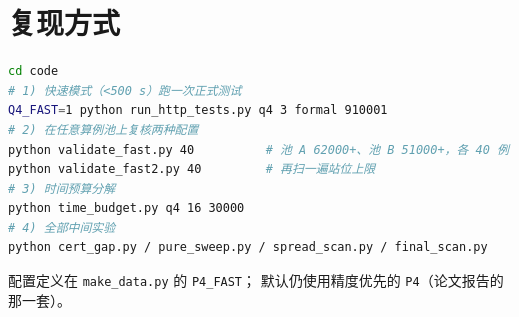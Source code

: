 \section{复现方式}

\begin{lstlisting}[language=bash]
cd code
# 1) 快速模式（<500 s）跑一次正式测试
Q4_FAST=1 python run_http_tests.py q4 3 formal 910001
# 2) 在任意算例池上复核两种配置
python validate_fast.py 40          # 池 A 62000+、池 B 51000+，各 40 例
python validate_fast2.py 40         # 再扫一遍站位上限
# 3) 时间预算分解
python time_budget.py q4 16 30000
# 4) 全部中间实验
python cert_gap.py / pure_sweep.py / spread_scan.py / final_scan.py
\end{lstlisting}

配置定义在 \texttt{make\_data.py} 的 \texttt{P4\_FAST}；
默认仍使用精度优先的 \texttt{P4}（论文报告的那一套）。


